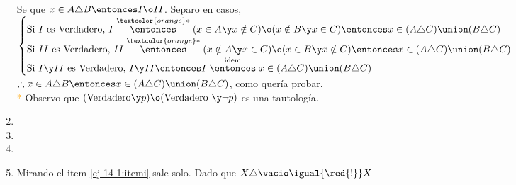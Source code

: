 \begin{enumerate}[label=\roman*)]
    Se que $x \in A \triangle B \entonces I \o II$. Separo en casos, \\
    $\begin{cases}
      \text{Si }I\text{ es Verdadero, }I \stackrel{\textcolor{orange}*}{\entonces} (x \in A \y x \notin C) \o (x \notin B \y x \in C) \entonces x \in (A \triangle C) \union (B \triangle C) \\
      \text{Si }II\text{ es Verdadero, }II \stackrel{\textcolor{orange}*}{\entonces} (x \notin A \y x \in C) \o (x \in B \y x \notin C) \entonces x \in (A \triangle C) \union (B \triangle C) \\
      \text{Si }I \y II\text{ es Verdadero, }I \y II \entonces I \stackrel{\text{idem}}{\entonces} x \in (A \triangle C) \union (B \triangle C)
    \end{cases}$ \\
    $\therefore x \in A \triangle B \entonces x \in (A \triangle C) \union (B \triangle C)$, como quería probar. \\
    {\textcolor{orange}*} Observo que $(\text{Verdadero} \y p) \o (\text{Verdadero } \y \neg p)$ es una tautología.


  \item  \Hacer
  \item  \Hacer
  \item  \Hacer
  \item  Mirando el item \ref{ej-14-1:itemi} sale solo. Dado que $X \triangle \vacio \igual{\red{!}} X$
\end{enumerate}

